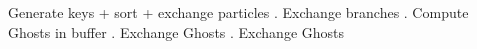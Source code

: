 \documentclass[preview,border=5pt]{standalone}
\begin{document}
\begin{algorithmic}[1]
\State Generate keys + sort + exchange particles 
. Exchange branches 
. Compute Ghosts in buffer
. Exchange Ghosts 
\State {\color{red}{$\rho$, $P$, $c_s$, ...}}
. Exchange Ghosts 
\State {\color{red}{Integration, move particles}}
\State {\color{red}{Output}}
\EndWhile
\end{algorithmic}
\end{document}
